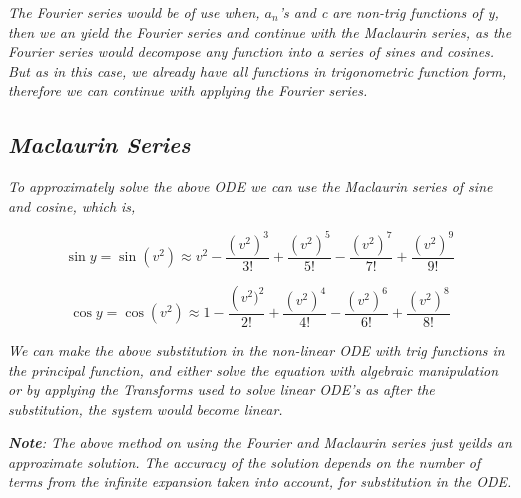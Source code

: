 		\textit{The Fourier series would be of use when, $a_n$'s and c are non-trig functions of y, then we an yield the Fourier series and continue with the Maclaurin series, as the Fourier series would decompose any function into a series of sines and cosines. But as in this case, we already have all functions in trigonometric function form, therefore we can continue with applying the Fourier series.}	
	
	\subsection{\textit{Maclaurin Series}}

		\textit{To approximately solve the above ODE we can use the Maclaurin series of sine and cosine, which is,}

			$$\sin y = \sin\left(v^2\right) \approx v^2 - \frac{\left(v^2\right)^3}{3!} + \frac{\left(v^2\right)^5}{5!} - \frac{\left(v^2\right)^7}{7!} + \frac{\left(v^2\right)^9}{9!}$$

		$$\cos y = \cos\left(v^2\right) \approx 1 - \frac{\left(v^2)^2}{2!} + \frac{\left(v^2\right)^4}{4!} - \frac{\left(v^2\right)^6}{6!} + \frac{\left(v^2\right)^8}{8!}$$

		\textit{We can make the above substitution in the non-linear ODE with trig functions in the principal function, and either solve the equation with algebraic manipulation or by applying the Transforms used to solve linear ODE's as after the substitution, the system would become linear.}

		\textit{\textbf{Note}: The above method on using the Fourier and Maclaurin series just yeilds an approximate solution. The accuracy of the solution depends on the number of terms from the infinite expansion taken into account, for substitution in the ODE.}


